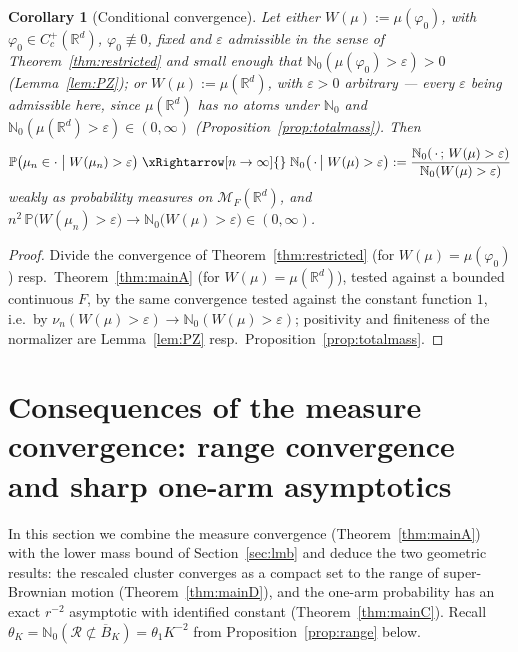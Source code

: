 \documentclass[11pt]{article}
\newtheorem{corollary}[theorem]{Corollary}
\theoremstyle{definition}
\theoremstyle{remark}
\newcommand{\R}{\mathbb{R}}
\newcommand{\bP}{\mathbb{P}}
\newcommand{\bN}{{\mathbb{N}_0}}                 %
\newcommand{\cM}{{\mathcal{M}_F(\R^d)}}          %
\newcommand{\Cc}{C_c^+(\R^d)}
\newcommand{\Ran}{\mathcal{R}}                 %
\newcommand{\eps}{\varepsilon}
\numberwithin{equation}{section}
\theoremstyle{plain}
\theoremstyle{definition}
\theoremstyle{remark}
\theoremstyle{plain}
\begin{document}
%
\begin{corollary}[Conditional convergence]\label{cor:conditional}\label{cor:conditionalmass}
Let either $W(\mu):=\mu(\varphi_0)$, with $\varphi_0\in\Cc$, $\varphi_0\not\equiv0$, fixed
and $\eps$ admissible in the sense of Theorem~\ref{thm:restricted} and small
enough that $\bN(\mu(\varphi_0)>\eps)>0$ (Lemma~\ref{lem:PZ}); or
$W(\mu):=\mu(\R^d)$, with $\eps>0$ arbitrary --- every $\eps$ being admissible
here, since $\mu(\R^d)$ has no atoms under $\bN$ and
$\bN(\mu(\R^d)>\eps)\in(0,\infty)$ (Proposition~\ref{prop:totalmass}). Then
\[
\bP\bigl(\mu_n\in\cdot\;\big|\;W(\mu_n)>\eps\bigr)
\;\xRightarrow[n\to\infty]{}\;
\bN\bigl(\,\cdot\,\big|\;W(\mu)>\eps\bigr)
:=\frac{\bN(\,\cdot\,;\,W(\mu)>\eps)}{\bN(W(\mu)>\eps)}
\]
weakly as probability measures on $\cM$, and
$n^{2}\,\bP\bigl(W(\mu_n)>\eps\bigr)\to\bN\bigl(W(\mu)>\eps\bigr)\in(0,\infty)$.
\end{corollary}

\begin{proof}
Divide the convergence of Theorem~\ref{thm:restricted} (for
$W(\mu)=\mu(\varphi_0)$) resp.\ Theorem~\ref{thm:mainA} (for
$W(\mu)=\mu(\R^d)$), tested against a bounded continuous $F$, by the same
convergence tested against the constant function $1$, i.e.\ by
$\nu_n(W(\mu)>\eps)\to\bN(W(\mu)>\eps)$; positivity and finiteness of the
normalizer are Lemma~\ref{lem:PZ} resp.\ Proposition~\ref{prop:totalmass}.
\end{proof}


\section{Consequences of the measure convergence: range convergence and sharp one-arm asymptotics}
\label{sec:onearm}

In this section we combine the measure convergence (Theorem~\ref{thm:mainA})
with the lower mass bound of Section~\ref{sec:lmb} and deduce the two
geometric results: the rescaled cluster converges as a compact set to the
range of super-Brownian motion (Theorem~\ref{thm:mainD}), and the one-arm
probability has an exact $r^{-2}$ asymptotic with identified constant
(Theorem~\ref{thm:mainC}). Recall
$\theta_K=\bN(\Ran\not\subset\overline B_K)=\theta_1K^{-2}$ from
Proposition~\ref{prop:range} below.
\end{document}
